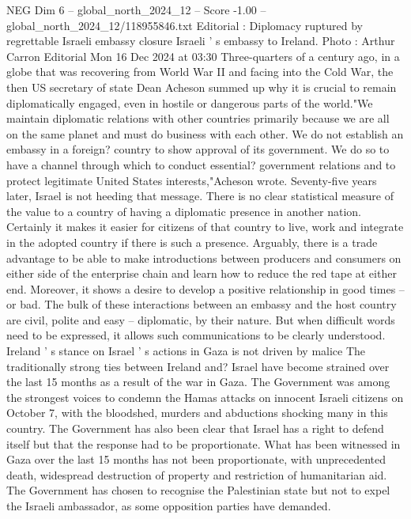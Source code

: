\begin{textsample}{NEG Dim 6 – global\_north\_2024\_12 – Score -1.00 – global\_north\_2024\_12/118955846.txt}  \label{ex:f6_neg_196}
Editorial : Diplomacy ruptured by regrettable Israeli embassy closure Israeli ' s embassy to Ireland.
Photo : Arthur Carron Editorial Mon 16 Dec 2024 at 03:30 Three-quarters of a century ago, in a globe that was recovering from World War II and facing into the Cold War, the then US secretary of state Dean Acheson summed up why it is crucial to remain diplomatically engaged, even in hostile or dangerous parts of the world."We maintain diplomatic relations with other countries primarily because we are all on the same planet and must do business with each other.
We do not establish an embassy in a foreign? country to show approval of its government.
We do so to have a channel through which to conduct essential? government relations and to protect legitimate United States interests,"Acheson wrote.
Seventy-five years later, Israel is not heeding that message.
There is no clear statistical measure of the value to a country of having a diplomatic presence in another nation.
Certainly it makes it easier for citizens of that country to live, work and integrate in the adopted country if there is such a presence.
Arguably, there is a trade advantage to be able to make introductions between producers and consumers on either side of the enterprise chain and learn how to reduce the red tape at either end.
Moreover, it shows a desire to develop a positive relationship in good times -- or bad.
The bulk of these interactions between an embassy and the host country are civil, polite and easy -- diplomatic, by their nature.
But when difficult words need to be expressed, it allows such communications to be clearly understood.
Ireland ' s stance on Israel ' s actions in Gaza is not driven by malice The traditionally strong ties between Ireland and?
Israel have become strained over the last 15 months as a result of the war in Gaza.
The Government was among the strongest voices to condemn the Hamas attacks on innocent Israeli citizens on October 7, with the bloodshed, murders and abductions shocking many in this country.
The Government has also been clear that Israel has a right to defend itself but that the response had to be proportionate.
What has been witnessed in Gaza over the last 15 months has not been proportionate, with unprecedented death, widespread destruction of property and restriction of humanitarian aid.
The Government has chosen to recognise the Palestinian state but not to expel the Israeli ambassador, as some opposition parties have demanded.

\end{textsample}

